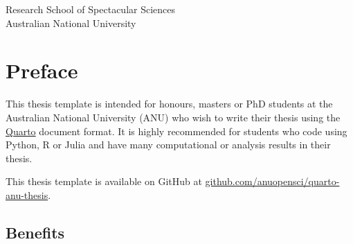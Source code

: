 \documentclass[
  a4paper,
  oneside,
  openany,
  12pt,
  onecolumn]{book}
\renewcommand*\contentsname{Table of contents}
\newcommand\contentsname{Table of contents}
\theoremstyle{definition}
\theoremstyle{plain}
\theoremstyle{remark}
\begin{document}
\begin{frontmatter}
\begin{titlepage}
\begin{titlepage}
  \noindent Research School of Spectacular Sciences\\
  \noindent Australian National University

  \end{titlepage}
  \setlength{\parindent}{0pt}
  \setlength{\parskip}{1ex plus 0.5ex minus 0.2ex}








  \end{titlepage}
  \end{frontmatter}


\renewcommand*\contentsname{Table of contents}
{
\setcounter{tocdepth}{2}
\tableofcontents
}
\listoffigures
{}
\listoftables
{}
\mainmatter
{}

\chapter*{Preface}\label{preface}


This thesis template is intended for honours, masters or PhD students at
the Australian National University (ANU) who wish to write their thesis
using the \href{https://quarto.org/}{Quarto} document format. It is
highly recommended for students who code using Python, R or Julia and
have many computational or analysis results in their thesis.

\begin{tcolorbox}[enhanced jigsaw, titlerule=0mm, left=2mm, title=\textcolor{quarto-callout-note-color}{\faInfo}\hspace{0.5em}{Note}, breakable, colback=white, toprule=.15mm, opacityback=0, rightrule=.15mm, coltitle=black, leftrule=.75mm, opacitybacktitle=0.6, colbacktitle=quarto-callout-note-color!10!white, bottomtitle=1mm, arc=.35mm, toptitle=1mm, bottomrule=.15mm, colframe=quarto-callout-note-color-frame]

This thesis template is available on GitHub at
\href{https://github.com/anuopensci/quarto-anu-thesis}{github.com/anuopensci/quarto-anu-thesis}.

\end{tcolorbox}

\section*{Benefits}\label{benefits}
\end{document}
